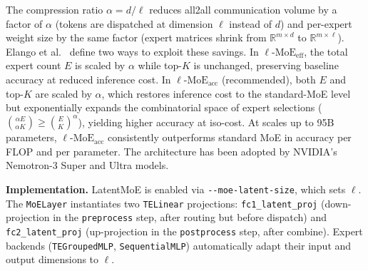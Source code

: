 The compression ratio \(\alpha = d / \ell\) reduces all2all communication volume by a factor of \(\alpha\) (tokens are dispatched at dimension \(\ell\) instead of \(d\)) and per-expert weight size by the same factor (expert matrices shrink from \(\mathbb{R}^{m \times d}\) to \(\mathbb{R}^{m \times \ell}\)). Elango et al.~\cite{elango2026latentmoe} define two ways to exploit these savings. In \(\ell\text{-MoE}_{\text{eff}}\), the total expert count \(E\) is scaled by \(\alpha\) while top-\(K\) is unchanged, preserving baseline accuracy at reduced inference cost. In \(\ell\text{-MoE}_{\text{acc}}\) (recommended), both \(E\) and top-\(K\) are scaled by \(\alpha\), which restores inference cost to the standard-MoE level but exponentially expands the combinatorial space of expert selections (\(\binom{\alpha E}{\alpha K} \geq \binom{E}{K}^{\alpha}\)), yielding higher accuracy at iso-cost. At scales up to 95B parameters, \(\ell\text{-MoE}_{\text{acc}}\) consistently outperforms standard MoE in accuracy per FLOP and per parameter. The architecture has been adopted by NVIDIA's Nemotron-3 Super and Ultra models.

\textbf{Implementation.}
LatentMoE is enabled via \texttt{-{}-moe-latent-size}, which sets \(\ell\). The \texttt{MoELayer} instantiates two \texttt{TELinear} projections: \texttt{fc1\_latent\_proj} (down-projection in the \texttt{preprocess} step, after routing but before dispatch) and \texttt{fc2\_latent\_proj} (up-projection in the \texttt{postprocess} step, after combine). Expert backends (\texttt{TEGroupedMLP}, \texttt{SequentialMLP}) automatically adapt their input and output dimensions to \(\ell\).


